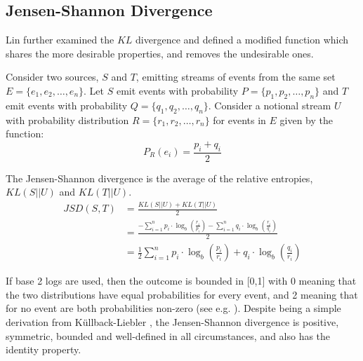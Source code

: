 \subsection{Jensen-Shannon Divergence}
Lin \cite{Lin:1999}  further examined the $KL$ divergence and defined a modified function which shares the more desirable properties, and removes the undesirable ones.
\begin{mydef}
Consider two sources, $S$ and $T$, emitting streams of events from the same set $E = \{e_1, e_2, \ldots, e_n\}$.  Let $S$ emit events with probability $P = \{p_1, p_2, \ldots, p_n\}$ and $T$ emit events with probability $Q = \{q_1, q_2, \ldots, q_n\}$.  Consider a notional stream $U$ with probability distribution $R = \{r_1, r_2, \ldots, r_n\}$ for events in $E$ given by the function: 
\begin{equation*}
	P_R(e_i) = \frac{p_i + q_i}{2}
\end{equation*}

The Jensen-Shannon divergence is the average of the relative entropies, $KL(S||U)$ and $KL(T||U)$.
\begin{align*}
	JSD(S,T)		&= \frac{KL(S||U) + KL(T||U)}{2}\\
				&= \frac{-\sum_{i = 1}^n  p_i \cdot \log_b (\frac{r_i}{p_i}) -\sum_{i = 1}^n  q_i \cdot \log_b (\frac{r_i}{q_i})}{2}\\
				&= \frac{1}{2} \sum_{i = 1}^n	 p_i \cdot \log_b (\frac{p_i}{r_i}) + q_i \cdot \log_b (\frac{q_i}{r_i})
\end{align*}
\end{mydef}




If base 2 logs are used, then the outcome is bounded in [0,1] with 0 meaning that the two distributions have equal probabilities for every event, and 2 meaning that for no event are both probabilities non-zero (see e.g. \cite{Lin:1999}). Despite being a simple derivation from K\"ullback-Liebler \cite{Lin:1999}, the Jensen-Shannon divergence is positive, symmetric, bounded and well-defined in all circumstances, and also has the identity property.

